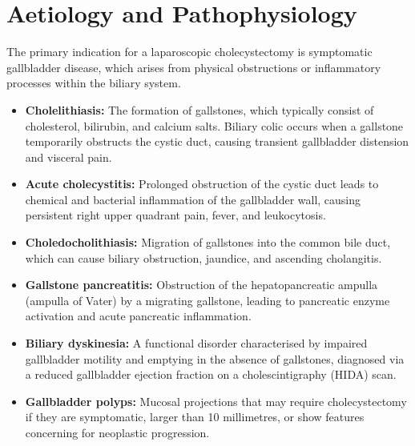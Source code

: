 \section*{Aetiology and Pathophysiology}
The primary indication for a laparoscopic cholecystectomy is symptomatic gallbladder disease, which arises from physical obstructions or inflammatory processes within the biliary system.
\begin{itemize}
    \item \textbf{Cholelithiasis:} The formation of gallstones, which typically consist of cholesterol, bilirubin, and calcium salts. Biliary colic occurs when a gallstone temporarily obstructs the cystic duct, causing transient gallbladder distension and visceral pain.
    \item \textbf{Acute cholecystitis:} Prolonged obstruction of the cystic duct leads to chemical and bacterial inflammation of the gallbladder wall, causing persistent right upper quadrant pain, fever, and leukocytosis.
    \item \textbf{Choledocholithiasis:} Migration of gallstones into the common bile duct, which can cause biliary obstruction, jaundice, and ascending cholangitis.
    \item \textbf{Gallstone pancreatitis:} Obstruction of the hepatopancreatic ampulla (ampulla of Vater) by a migrating gallstone, leading to pancreatic enzyme activation and acute pancreatic inflammation.
    \item \textbf{Biliary dyskinesia:} A functional disorder characterised by impaired gallbladder motility and emptying in the absence of gallstones, diagnosed via a reduced gallbladder ejection fraction on a cholescintigraphy (HIDA) scan.
    \item \textbf{Gallbladder polyps:} Mucosal projections that may require cholecystectomy if they are symptomatic, larger than 10 millimetres, or show features concerning for neoplastic progression.
\end{itemize}

